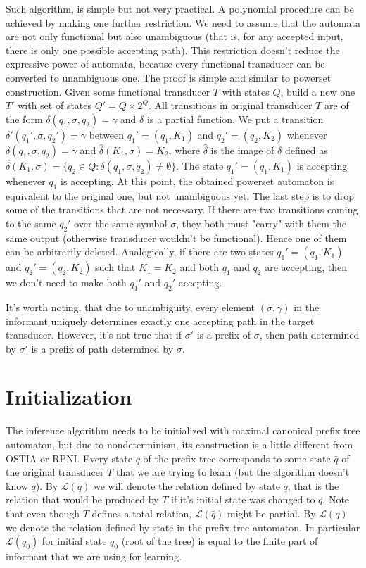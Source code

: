 Such algorithm, is simple but not very practical. A polynomial procedure can be achieved by making one further restriction. We need to assume that the automata are not only functional but also unambiguous (that is, for any accepted input, there is only one possible accepting path). This restriction doesn't reduce the expressive power of automata, because every functional transducer can be converted to unambiguous one. The proof is simple and similar to powerset construction. Given some functional transducer $T$ with states $Q$,  build a new one $T'$ with set of states $Q' = Q \times 2^Q$. All transitions in original transducer $T$ are of the form $\delta(q_1,\sigma,q_2)=\gamma$ and $\delta$ is a partial function. We put a transition $\delta'(q_1',\sigma,q_2')=\gamma$ between $q_1' = (q_1,K_1)$  and $q_2' = (q_2,K_2)$  whenever $\delta(q_1,\sigma,q_2)=\gamma$ and $\hat{\delta}(K_1,\sigma)=K_2$, where $\hat{\delta}$ is the image of $\delta$ defined as $\hat{\delta}(K_1,\sigma)=\{q_2\in Q : \delta(q_1,\sigma,q_2)\ne\emptyset \}$. The state $q_1'=(q_1,K_1)$ is accepting whenever $q_1$ is accepting. At this point, the obtained powerset automaton is equivalent to the original one, but not unambiguous yet. The last step is to drop some of the transitions that are not necessary. If there are two transitions coming to the same $q_2'$ over the same symbol $\sigma$, they both must "carry" with them the same output (otherwise transducer wouldn't be functional). Hence one of them can be arbitrarily deleted. Analogically, if there are two states 
$q_1'=(q_1,K_1)$ and $q_2'=(q_2,K_2)$ such that $K_1=K_2$ and both $q_1$ and $q_2$ are accepting, then we don't need to make both $q_1'$ and $q_2'$ accepting. 

It's worth noting, that due to unambiguity, every element $(\sigma,\gamma)$ in the informant uniquely determines exactly one accepting path in the target transducer. However, it's not true that if $\sigma'$ is a prefix of $\sigma$, then path determined by $\sigma'$ is a prefix of path determined by $\sigma$.

\section{Initialization}

The inference algorithm needs to be initialized with maximal canonical prefix tree automaton, but due to nondeterminism, its construction is a little different from OSTIA or RPNI. Every state $q$ of the prefix tree corresponds to some state $\bar{q}$ of the original transducer $T$ that we are trying to learn (but the algorithm doesn't know $\bar{q}$). By  $\mathcal{L}(\bar{q})$ we will denote the relation defined by state $\bar{q}$, that is the relation that would be produced by $T$ if it's initial state was changed to $\bar{q}$. Note that even though $T$ defines a total relation, $\mathcal{L}(\bar{q})$ might be partial. By $\mathcal{L}(q)$ we denote the relation defined by state in the prefix tree automaton. In particular $\mathcal{L}(q_0)$ for initial state $q_0$ (root of the tree) is equal to the finite part of informant that we are using for learning.

